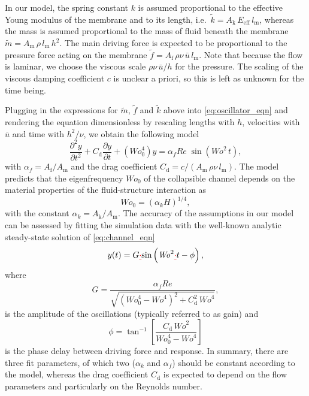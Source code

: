 \documentclass[aps,prl,reprint,superscriptaddress,floatfix]{revtex4-1}
\newcommand{\Rey}{\mathit{Re}}
\newcommand{\Wo}{\mathit{Wo}}
\providecommand{\DIFdel}[1]{{\protect\color{red}\sout{#1}}}                      %
\providecommand{\DIFdelbegin}{} %
\providecommand{\DIFdelend}{} %
\begin{document}
In our model, the spring constant $k$ is assumed proportional to the effective Young modulus of the membrane and to its length, i.e.~$\tilde k=A_\text{k}\, E_\text{eff}\,l_\text{m}$, whereas the mass is assumed proportional to the mass of fluid beneath the membrane $\tilde m=A_\text{m}\, \rho\, l_\text{m}\, h^2$. The main driving force is expected to be proportional to the pressure force acting on the membrane $\tilde f=A_\text{f}\,\rho\nu\, \bar{u}\, l_\text{m}$. Note that because the flow is laminar, we choose the viscous scale $\rho\nu\, \bar{u}/h$ for the pressure. The scaling of the viscous damping coefficient $c$ is unclear a priori, so this is left as unknown for the time being. 

Plugging in the expressions for $\tilde m$,  $\tilde f$ and $\tilde k$ above into \eqref{eq:oscillator_eqn} and rendering the equation dimensionless by rescaling lengths with $h$, velocities with $\bar{u}$ and time with $h^2/\nu$, we obtain the following model 
\begin{equation}
\frac{\partial^2 y}{\partial t^2}+C_\text{d}\frac{\partial y}{\partial t}+\left(\Wo^4_0\right)y={\alpha_f}{\Rey}\;\sin\left(\Wo^2 \, t\right),
\label{eq:channel_eqn}
\end{equation}
with $\alpha_f=A_\text{f}/A_\text{m}$ and the drag coefficient $C_\text{d}=c/(A_\text{m}\,\rho\nu\,l_\text{m})$. The model predicts that the eigenfrequency $\Wo_0$ of the collapsible channel depends on the material properties of the fluid-structure interaction as
\begin{equation}\label{eq:model_St0}
\Wo_0=({\alpha_k}H)^{1/4},
\end{equation}
with the constant $\alpha_k=A_\text{k}/A_\text{m}$. The accuracy of the assumptions in our model can be assessed by fitting the simulation data with the well-known analytic steady-state solution of \eqref{eq:channel_eqn} 
\begin{equation}
y(t)=G \DIFdelbegin \DIFdel{\cdot}\DIFdelend \text{sin}\left(\Wo^2  \DIFdelbegin \DIFdel{\cdot }\DIFdelend t-\phi\right),
\label{eq:channel_solution}
\end{equation}
where 
\begin{equation}
G = \dfrac{{\alpha_f}{\Rey}}{\sqrt{\left(\Wo^4_0-\Wo^4\right)^2+C_\text{d}^2\,\Wo^4}},
\label{eq:channel_gain}
\end{equation}
is the amplitude of the oscillations (typically referred to as gain) and 
\begin{equation}
\phi=\tan^{-1}\left[\dfrac{C_\text{d}\, \Wo^2}{\Wo_0^4-\Wo^4}\right]
\label{eq:channel_phase}
\end{equation}
is the phase delay between driving force and response. In summary, there are three fit parameters, of which two ($\alpha_k$ and $\alpha_f$) should be constant according to the model, whereas the drag coefficient $C_\text{d}$ is expected to depend on the flow parameters and particularly on the Reynolds number. 
\end{document}
